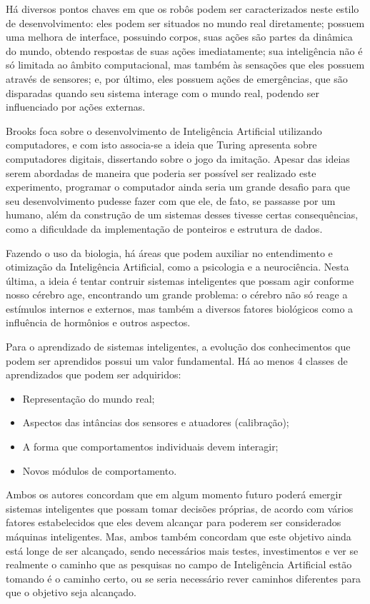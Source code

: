 \documentclass[a4paper,11pt]{article}
\begin{document}
Há diversos pontos chaves em que os robôs podem ser caracterizados neste estilo de desenvolvimento: eles podem ser situados no mundo real diretamente; possuem uma melhora de interface, possuindo corpos, suas ações são partes da dinâmica do mundo, obtendo respostas de suas ações imediatamente; sua inteligência não é só limitada ao âmbito computacional, mas também às sensações que eles possuem através de sensores; e, por último, eles possuem ações de emergências, que são disparadas quando seu sistema interage com o mundo real, podendo ser influenciado por ações externas.

Brooks foca sobre o desenvolvimento de Inteligência Artificial utilizando computadores, e com isto associa-se a ideia que Turing apresenta sobre computadores digitais, dissertando sobre o jogo da imitação. Apesar das ideias serem abordadas de maneira que poderia ser possível ser realizado este experimento, programar o computador ainda seria um grande desafio para que seu desenvolvimento pudesse fazer com que ele, de fato, se passasse por um humano, além da construção de um sistemas desses tivesse certas consequências, como a dificuldade da implementação de ponteiros e estrutura de dados.

Fazendo o uso da biologia, há áreas que podem auxiliar no entendimento e otimização da Inteligência Artificial, como a psicologia e a neurociência. Nesta última, a ideia é tentar contruir sistemas inteligentes que possam agir conforme nosso cérebro age, encontrando um grande problema: o cérebro não só reage a estímulos internos e externos, mas também a diversos fatores biológicos como a influência de hormônios e outros aspectos.

Para o aprendizado de sistemas inteligentes, a evolução dos conhecimentos que podem ser aprendidos possui um valor fundamental. Há ao menos 4 classes de aprendizados que podem ser adquiridos:
 
\begin{itemize}
	\item Representação do mundo real;
	\item Aspectos das intâncias dos sensores e atuadores (calibração);
	\item A forma que comportamentos individuais devem interagir;
	\item Novos módulos de comportamento.
\end{itemize}

Ambos os autores concordam que em algum momento futuro poderá emergir sistemas inteligentes que possam tomar decisões próprias, de acordo com vários fatores estabelecidos que eles devem alcançar para poderem ser considerados máquinas inteligentes. Mas, ambos também concordam que este objetivo ainda está longe de ser alcançado, sendo necessários mais testes, investimentos e ver se realmente o caminho que as pesquisas no campo de Inteligência Artificial estão tomando é o caminho certo, ou se seria necessário rever caminhos diferentes para que o objetivo seja alcançado.
\end{document}
